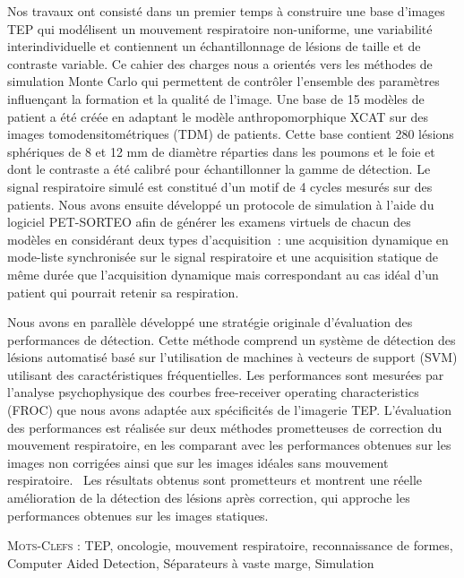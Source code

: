 Nos travaux ont consisté dans un premier temps à construire une base d’images TEP qui modélisent un mouvement respiratoire non-uniforme, une variabilité interindividuelle et contiennent un échantillonnage de lésions de taille et de contraste variable. Ce cahier des charges nous a orientés vers les méthodes de simulation Monte Carlo qui permettent de contrôler l’ensemble des paramètres influençant la formation et la qualité de l’image. Une base de 15 modèles de patient a été créée en adaptant le modèle anthropomorphique XCAT sur des images tomodensitométriques (TDM) de patients. Cette base contient 280 lésions sphériques de 8 et 12 mm de diamètre réparties dans les poumons et le foie et dont le contraste a été calibré pour échantillonner la gamme de détection. Le signal respiratoire simulé est constitué d’un motif de 4 cycles mesurés sur des patients. Nous avons ensuite développé un protocole de simulation à l’aide du logiciel PET-SORTEO afin de générer les examens virtuels de chacun des modèles en considérant deux types d’acquisition : une acquisition dynamique en mode-liste synchronisée sur le signal respiratoire et une acquisition statique de même durée que l’acquisition dynamique mais correspondant au cas idéal d’un patient qui pourrait retenir sa respiration.

Nous avons en parallèle développé une stratégie originale d’évaluation des performances de détection. Cette méthode comprend un système de détection des lésions automatisé basé sur l'utilisation de machines à vecteurs de support (SVM) utilisant des caractéristiques fréquentielles. Les performances sont mesurées par l’analyse psychophysique des courbes free-receiver operating characteristics (FROC) que nous avons adaptée aux spécificités de l’imagerie TEP. L’évaluation des performances est réalisée sur deux méthodes prometteuses de correction du mouvement respiratoire, en les comparant avec les performances obtenues sur les images non corrigées ainsi que sur les images idéales sans mouvement respiratoire. 
Les résultats obtenus sont prometteurs et montrent une réelle amélioration de la détection des lésions après correction, qui approche les performances obtenues sur les images statiques. 

\textsc{Mots-Clefs :} TEP, oncologie, mouvement respiratoire, reconnaissance de formes, Computer Aided Detection, Séparateurs à vaste marge, Simulation